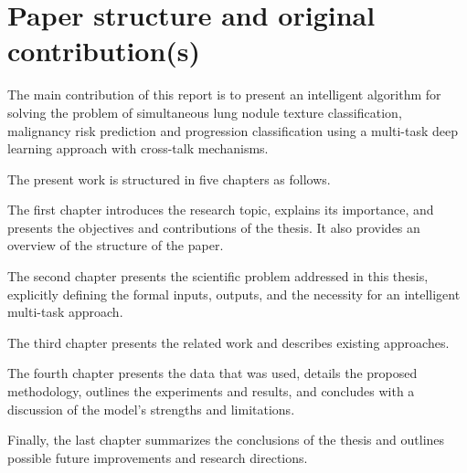 \section{Paper structure and original contribution(s)}
\label{section:structure}

The main contribution of this report is to present an intelligent algorithm for solving the problem of simultaneous lung nodule texture classification, malignancy risk prediction and progression classification using a multi-task deep learning approach with cross-talk mechanisms.

The present work is structured in five chapters as follows. %

The first chapter introduces the research topic, explains its importance, and presents the objectives and contributions of the thesis. It also provides an overview of the structure of the paper.

The second chapter presents the scientific problem addressed in this thesis, explicitly defining the formal inputs, outputs, and the necessity for an intelligent multi-task approach.

The third chapter presents the related work and describes existing approaches.

The fourth chapter presents the data that was used, details the proposed methodology, outlines the experiments and results, and concludes with a discussion of the model's strengths and limitations.

Finally, the last chapter summarizes the conclusions of the thesis and outlines possible future improvements and research directions.